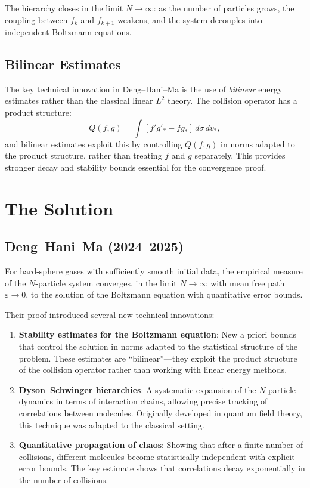 The hierarchy closes in the limit $N \to \infty$: as the number of particles grows, the coupling between $f_k$ and $f_{k+1}$ weakens, and the system decouples into independent Boltzmann equations.

\subsection{Bilinear Estimates}

The key technical innovation in Deng--Hani--Ma is the use of \emph{bilinear} energy estimates rather than the classical linear $L^2$ theory. The collision operator has a product structure:
\[
Q(f, g) = \int [f' g'_* - f g_*] \, d\sigma \, dv_*,
\]
and bilinear estimates exploit this by controlling $Q(f, g)$ in norms adapted to the product structure, rather than treating $f$ and $g$ separately. This provides stronger decay and stability bounds essential for the convergence proof.

\section{The Solution}

\subsection{Deng--Hani--Ma (2024--2025)}

\begin{theorem}
For hard-sphere gases with sufficiently smooth initial data, the empirical measure of the $N$-particle system converges, in the limit $N \to \infty$ with mean free path $\varepsilon \to 0$, to the solution of the Boltzmann equation with quantitative error bounds.
\end{theorem}

Their proof introduced several new technical innovations:

\begin{enumerate}
\item \textbf{Stability estimates for the Boltzmann equation}: New a priori bounds that control the solution in norms adapted to the statistical structure of the problem. These estimates are ``bilinear''---they exploit the product structure of the collision operator rather than working with linear energy methods.
\item \textbf{Dyson--Schwinger hierarchies}: A systematic expansion of the $N$-particle dynamics in terms of interaction chains, allowing precise tracking of correlations between molecules. Originally developed in quantum field theory, this technique was adapted to the classical setting.
\item \textbf{Quantitative propagation of chaos}: Showing that after a finite number of collisions, different molecules become statistically independent with explicit error bounds. The key estimate shows that correlations decay exponentially in the number of collisions.
\end{enumerate}

